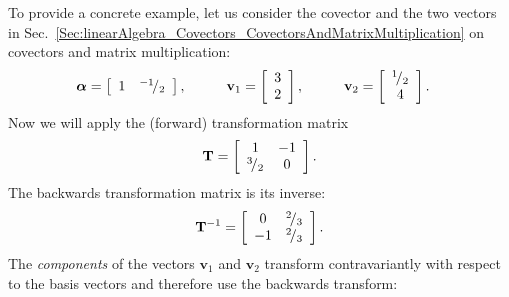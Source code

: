 To provide a concrete example, let us consider the covector and the two vectors in Sec.~\ref{Sec:linearAlgebra_Covectors_CovectorsAndMatrixMultiplication} on covectors and matrix multiplication:
\begin{align}
  \boldsymbol\alpha &= \left[ \begin{array}{c c} 1 & {}^{-1}\!/_{2} \\ \end{array} \right] , \hspace{1cm}
  \mathbf{v}_1 = \left[ \begin{array}{c} 3 \\ 2 \\ \end{array} \right] , \hspace{1cm} 
  \mathbf{v}_2 = \left[ \begin{array}{c} {}^{1}\!/_{2} \\ 4 \\ \end{array} \right]. \nonumber
\end{align}
Now we will apply the (forward) transformation matrix
\begin{align}
  \mathbf{T} = \left[ \begin{array}{c c} 1 & -1 \\ {}^{3}\!/_{2} & 0 \end{array} \right] . \nonumber
\end{align}
The backwards transformation matrix is its inverse:
\begin{align}
  \mathbf{T}^{-1} = \left[ \begin{array}{c c} 0 & {}^{2}\!/_{3} \\  -1 & {}^{2}\!/_{3} \end{array} \right] . \nonumber
\end{align}
The \emph{components} of the vectors $\mathbf{v}_1$ and $\mathbf{v}_2$ transform contravariantly with respect to the basis vectors and therefore use the backwards transform:

